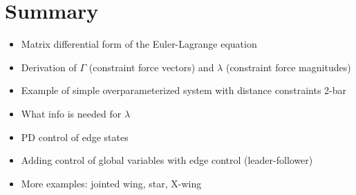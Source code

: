 \documentclass[conference]{IEEEtran}
\begin{document}
\section{Summary}
\begin{itemize}
    \item Matrix differential form of the Euler-Lagrange equation
    \item Derivation of $\Gamma$ (constraint force vectors) and $\lambda$ (constraint force magnitudes)
    \item Example of simple overparameterized system with distance constraints 2-bar
    \item What info is needed for $\lambda$
    \item PD control of edge states
    \item Adding control of global variables with edge control (leader-follower)
    \item More examples: jointed wing, star, X-wing
\end{itemize}

\end{document}
